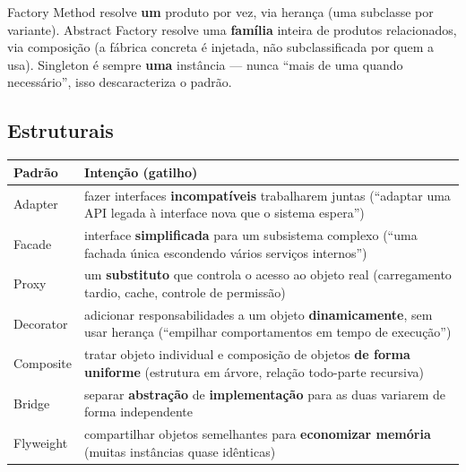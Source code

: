 \begin{cuidado}
Factory Method resolve \textbf{um} produto por vez, via herança (uma
subclasse por variante). Abstract Factory resolve uma \textbf{família}
inteira de produtos relacionados, via composição (a fábrica concreta é
injetada, não subclassificada por quem a usa). Singleton é sempre
\textbf{uma} instância --- nunca “mais de uma quando necessário”, isso
descaracteriza o padrão.
\end{cuidado}

\subsection{Estruturais}

\begin{conceito}
\begin{center}
\begin{tabular}{@{}p{2.8cm}p{9cm}@{}}
\toprule
\textbf{Padrão} & \textbf{Intenção (gatilho)} \\
\midrule
Adapter & fazer interfaces \textbf{incompatíveis} trabalharem juntas
(“adaptar uma API legada à interface nova que o sistema espera”) \\
Facade & interface \textbf{simplificada} para um subsistema complexo (“uma
fachada única escondendo vários serviços internos”) \\
Proxy & um \textbf{substituto} que controla o acesso ao objeto real
(carregamento tardio, cache, controle de permissão) \\
Decorator & adicionar responsabilidades a um objeto \textbf{dinamicamente},
sem usar herança (“empilhar comportamentos em tempo de execução”) \\
Composite & tratar objeto individual e composição de objetos \textbf{de
forma uniforme} (estrutura em árvore, relação todo-parte recursiva) \\
Bridge & separar \textbf{abstração} de \textbf{implementação} para as duas
variarem de forma independente \\
Flyweight & compartilhar objetos semelhantes para \textbf{economizar
memória} (muitas instâncias quase idênticas) \\
\bottomrule
\end{tabular}
\end{center}
\end{conceito}

